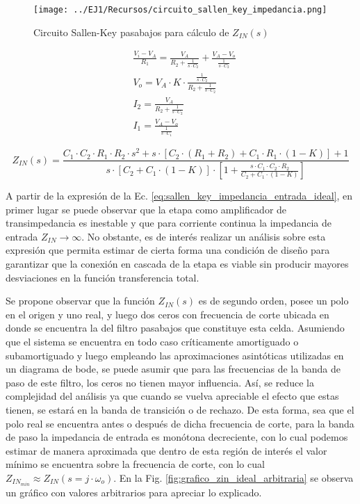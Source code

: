 \begin{figure}[H]
    \centering
    \texttt{[image: ../EJ1/Recursos/circuito\_sallen\_key\_impedancia.png]}
    \caption{Circuito Sallen-Key pasabajos para c\'alculo de $Z_{IN}(s)$}
    \label{fig:circuito_sallen_key_impedancia_entrada_ideal}
\end{figure}

\begin{align*}
    & \frac{V_i - V_A}{R_1} = \frac{V_A}{R_2 + \frac{1}{s \cdot C_2}} + \frac{V_A - V_o}{\frac{1}{s \cdot C_2}} \\
    & V_o = V_A \cdot K \cdot \frac{\frac{1}{s \cdot C_2}}{R_2 + \frac{1}{s \cdot C_2}} \\
    & I_2 = \frac{V_A}{R_2 + \frac{1}{s \cdot C_2}} \\
    & I_1 = \frac{V_A - V_o}{\frac{1}{s \cdot C_1}}
\end{align*}

\begin{equation}
    Z_{IN}(s) = \frac{C_1 \cdot C_2 \cdot R_1 \cdot R_2 \cdot s^{2} + s \cdot \left[ C_2 \cdot (R_1 + R_2) + C_1 \cdot R_1 \cdot (1 - K) \right] + 1}{s \cdot \left[C_2 + C_1 \cdot (1 - K) \right] \cdot \left[ 1 + \frac{s \cdot C_1 \cdot C_2 \cdot R_2}{C_2 + C_1 \cdot (1 - K)} \right]}
    \label{eq:sallen_key_impedancia_entrada_ideal}
\end{equation}

A partir de la expresi\'on de la Ec. \ref{eq:sallen_key_impedancia_entrada_ideal}, en primer lugar se puede observar que la etapa como amplificador de transimpedancia es inestable y que para corriente continua la impedancia de entrada $Z_{IN} \rightarrow \infty$.
No obstante, es de inter\'es realizar un an\'alisis sobre esta expresi\'on que permita estimar de cierta forma una condici\'on de dise\~no para garantizar que la conexi\'on en cascada de la etapa es viable sin producir mayores desviaciones en la funci\'on transferencia total.


Se propone observar que la funci\'on $Z_{IN}(s)$ es de segundo orden, posee un polo en el origen y uno real, y luego dos ceros con frecuencia de corte ubicada en donde se encuentra la del filtro pasabajos que constituye esta celda. Asumiendo que el sistema se encuentra en todo caso cr\'iticamente amortiguado o subamortiguado y luego empleando las aproximaciones asint\'oticas
utilizadas en un diagrama de bode, se puede asumir que para las frecuencias de la banda de paso de este filtro, los ceros no tienen mayor influencia. As\'i, se reduce la complejidad del an\'alisis ya que cuando se vuelva apreciable el efecto que estas tienen, se estar\'a en la banda de transici\'on o de rechazo.
De esta forma, sea que el polo real se encuentra antes o despu\'es de dicha frecuencia de corte, para la banda de paso la impedancia de entrada es mon\'otona decreciente, con lo cual podemos estimar de manera aproximada que dentro de esta regi\'on de inter\'es el valor m\'inimo se encuentra sobre la frecuencia de corte,
con lo cual $Z_{IN_{min}} \approx Z_{IN}(s=j \cdot \omega_o)$. En la Fig. \ref{fig:grafico_zin_ideal_arbitraria} se observa un gr\'afico con valores arbitrarios para apreciar lo explicado.

